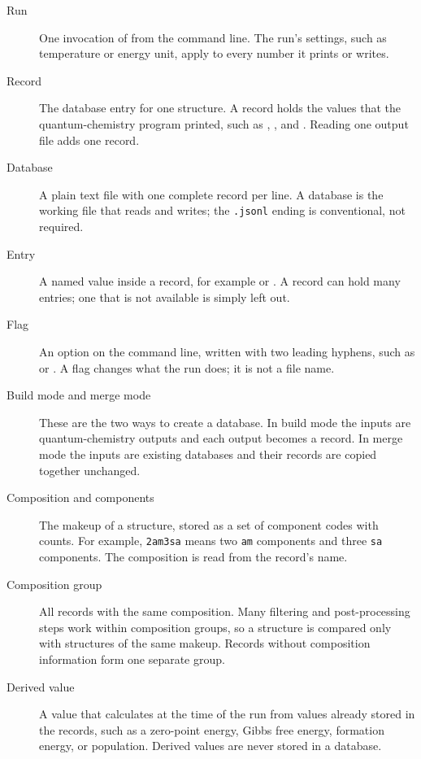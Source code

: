 \begin{description}
  \item[Run] One invocation of \CJKQC{} from the command line. The run's
        settings, such as temperature or energy unit, apply to every number
        it prints or writes.
  \item[Record] The database entry for one structure. A record holds the
        values that the quantum-chemistry program printed, such as
        , , and
        . Reading one output file adds one
        record.
  \item[Database] A plain text file with one complete record per line. A
        database is the working file that \CJKQC{} reads and writes; the
        \texttt{.jsonl} ending is conventional, not required.
  \item[Entry] A named value inside a record, for example
         or . A record can hold many
        entries; one that is not available is simply left out.
  \item[Flag] An option on the command line, written with two leading
        hyphens, such as  or . A flag changes
        what the run does; it is not a file name.
  \item[Build mode and merge mode] These are the two ways to create a
        database. In build mode the inputs are quantum-chemistry outputs and
        each output becomes a record. In merge mode the inputs are existing
        databases and their records are copied together unchanged.
  \item[Composition and components] The makeup of a structure, stored as a
        set of component codes with counts. For example, \texttt{2am3sa}
        means two \texttt{am} components and three \texttt{sa} components.
        The composition is read from the record's name.
  \item[Composition group] All records with the same composition. Many
        filtering and post-processing steps work within composition groups,
        so a structure is compared only with structures of the same makeup.
        Records without composition information form one separate group.
  \item[Derived value] A value that \CJKQC{} calculates at the time of the
        run from values already stored in the records, such as a zero-point
        energy, Gibbs free energy, formation energy, or population. Derived
        values are never stored in a database.

\end{description}
